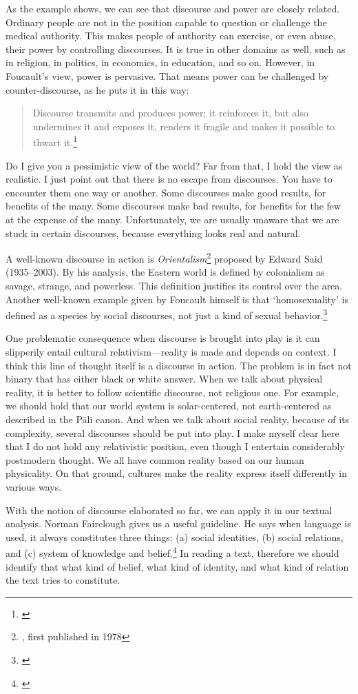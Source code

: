 As the example shows, we can see that discourse and power are closely related. Ordinary people are not in the position capable to question or challenge the medical authority. This makes people of authority can exercise, or even abuse, their power by controlling discourses. It is true in other domains as well, such as in religion, in politics, in economics, in education, and so on. However, in Foucault's view, power is pervasive. That means power can be challenged by counter-discourse, as he puts it in this way:

\begin{quote}
Discourse transmits and produces power; it reinforces it, but also undermines it and exposes it, renders it fragile and makes it possible to thwart it.\footnote{\citealp[p.~101]{foucault:sexuality}}
\end{quote}

Do I give you a pessimistic view of the world? Far from that, I hold the view as realistic. I just point out that there is no escape from discourses. You have to encounter them one way or another. Some discourses make good results, for benefits of the many. Some discourses make bad results, for benefits for the few at the expense of the many. Unfortunately, we are usually unaware that we are stuck in certain discourses, because everything looks real and natural.

A well-known discourse in action is \emph{Orientalism}\footnote{\citealp{said:orientalism}, first published in 1978} proposed by Edward Said (1935--2003). By his analysis, the Eastern world is defined by colonialism as savage, strange, and powerless. This definition justifies its control over the area. Another well-known example given by Foucault himself is that `homosexuality' is defined as a species by social discourses, not just a kind of sexual behavior.\footnote{\citealp[p.~101]{foucault:sexuality}}

One problematic consequence when discourse is brought into play is it can slipperily entail cultural relativism---reality is made and depends on context. I think this line of thought itself is a discourse in action. The problem is in fact not binary that has either black or white answer. When we talk about physical reality, it is better to follow scientific discourse, not religious one. For example, we should hold that our world system is solar-centered, not earth-centered as described in the P\=ali canon. And when we talk about social reality, because of its complexity, several discourses should be put into play. I make myself clear here that I do not hold any relativistic position, even though I entertain considerably postmodern thought. We all have common reality based on our human physicality. On that ground, cultures make the reality express itself differently in various ways.

With the notion of discourse elaborated so far, we can apply it in our textual analysis. Norman Fairclough gives us a useful guideline. He says when language is used, it always constitutes three things: (a) social identities, (b) social relations, and (c) system of knowledge and belief.\footnote{\citealp[p.~134]{fairclough:marketization}} In reading a text, therefore we should identify that what kind of belief, what kind of identity, and what kind of relation the text tries to constitute.
